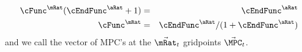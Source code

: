 \documentclass[./BufferStockTheory.tex]{subfiles}
\begin{document}
\begin{eqnarray*}
   \cFunc^{\mRat}(\cEndFunc^{\aRat}+1) & = & \cEndFunc^{\aRat}
\\ \cFunc^{\mRat} & = & \cEndFunc^{\aRat}/(1+\cEndFunc^{\aRat}) \label{eq:MPCfromMPTHC}
\end{eqnarray*}
and we call the vector of MPC's at the $\vec{\mRat}_{t}$ gridpoints $\vec{\MPC}_{t}$.
\begin{comment}

Standard polynomial interpolation methods can then be used to
construct a function that matches the level and first derivative at a
set of points; the actual solution code uses the built-in
interpolation tools of {\it Mathematica} for this purpose.

With the level and derivative of the consumption function defined at a discrete set of gridpoints,
it is possible to construct an interpolating function that is a highly accurate approximation to
the true consumption function within the grid.  But if any such interpolation is extended beyond the
boundaries defined by the minimum and maximum gridpoints, it is sure to go badly astray.


\end{comment}
\end{document}
